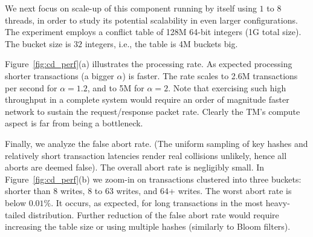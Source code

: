 We next focus on scale-up of this component running by itself using $1$ to $8$ threads, in order to study its potential scalability in even larger configurations.
The experiment employs a conflict table of 128M 64-bit integers (1G total size). The bucket size is $32$ integers, i.e., the table is 4M buckets big.  


Figure~\ref{fig:cd_perf}(a) illustrates the processing rate.
As expected processing shorter transactions (a bigger  $\alpha$) is faster.
The rate scales to 2.6M transactions per second for $\alpha=1.2$, and to 5M for 
$\alpha=2$. Note that exercising such high throughput in a complete system would require an 
order of magnitude faster network to sustain the request/response packet rate.    
Clearly the TM's compute aspect is far from being a bottleneck.

Finally, we analyze the false abort rate. (The uniform sampling of key hashes and relatively 
short transaction latencies render real collisions unlikely, hence all aborts 
are deemed false). The overall abort rate is negligibly small. In 
Figure~\ref{fig:cd_perf}(b) we  zoom-in
 on  transactions clustered into three buckets: shorter than $8$ writes, $8$ to $63$ writes, and 
$64$+ writes.
The worst abort rate is below $0.01\%$. It occurs, as expected, for long transactions in the 
most heavy-tailed distribution.  Further reduction of the false abort rate would require 
increasing the table size or using multiple hashes (similarly to Bloom filters). 


